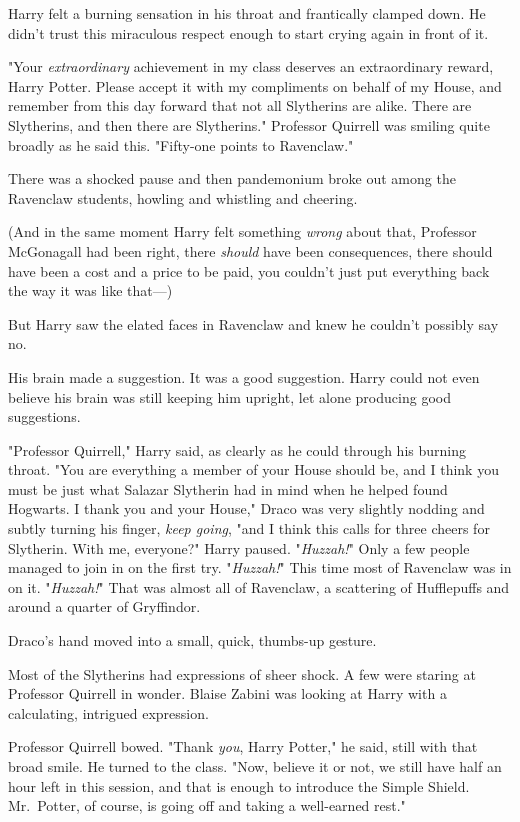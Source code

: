 Harry felt a burning sensation in his throat and frantically clamped down. He didn't trust this miraculous respect enough to start crying again in front of it.

"Your \emph{extraordinary} achievement in my class deserves an extraordinary reward, Harry Potter. Please accept it with my compliments on behalf of my House, and remember from this day forward that not all Slytherins are alike. There are Slytherins, and then there are Slytherins." Professor Quirrell was smiling quite broadly as he said this. "Fifty-one points to Ravenclaw."

There was a shocked pause and then pandemonium broke out among the Ravenclaw students, howling and whistling and cheering.

(And in the same moment Harry felt something \emph{wrong} about that, Professor McGonagall had been right, there \emph{should} have been consequences, there should have been a cost and a price to be paid, you couldn't just put everything back the way it was like that---)

But Harry saw the elated faces in Ravenclaw and knew he couldn't possibly say no.

His brain made a suggestion. It was a good suggestion. Harry could not even believe his brain was still keeping him upright, let alone producing good suggestions.

"Professor Quirrell," Harry said, as clearly as he could through his burning throat. "You are everything a member of your House should be, and I think you must be just what Salazar Slytherin had in mind when he helped found Hogwarts. I thank you and your House," Draco was very slightly nodding and subtly turning his finger, \emph{keep going}, "and I think this calls for three cheers for Slytherin. With me, everyone?" Harry paused. "\emph{Huzzah!}" Only a few people managed to join in on the first try. "\emph{Huzzah!}" This time most of Ravenclaw was in on it. "\emph{Huzzah!}" That was almost all of Ravenclaw, a scattering of Hufflepuffs and around a quarter of Gryffindor.

Draco's hand moved into a small, quick, thumbs-up gesture.

Most of the Slytherins had expressions of sheer shock. A few were staring at Professor Quirrell in wonder. Blaise Zabini was looking at Harry with a calculating, intrigued expression.

Professor Quirrell bowed. "Thank \emph{you}, Harry Potter," he said, still with that broad smile. He turned to the class. "Now, believe it or not, we still have half an hour left in this session, and that is enough to introduce the Simple Shield. Mr.~Potter, of course, is going off and taking a well-earned rest."

